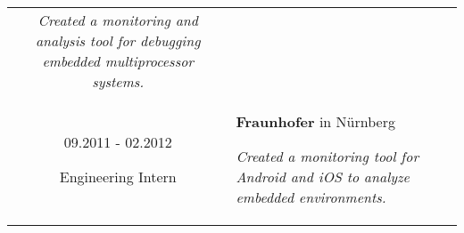 \documentclass[10pt]{article}
\begin{document}
\begin{tabular}{C Z D}
{		\vspace{0.05cm}
		
		{\scriptsize \it Created a monitoring and analysis tool for debugging embedded multiprocessor systems.}
		
		\vspace{0.0cm}
	}
	\\
	{
		09.2011 - 02.2012
		
		\vspace{-0.05cm}
		
		{\scriptsize Engineering Intern}
	}
	&
	{	
		{\bf Fraunhofer} {\scriptsize in N{\"u}rnberg}
		
		\vspace{0.05cm}
		
		{\scriptsize \it Created a monitoring tool for Android and iOS to analyze embedded environments.}
	}
	\\
\end{tabular}
\end{document}
